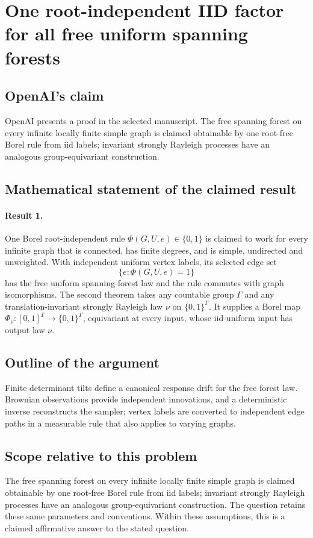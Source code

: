 \documentclass[11pt]{article}
\begin{document}
\section*{One root-independent IID factor for all free uniform spanning forests}

\subsection{OpenAI's claim}
OpenAI presents a proof in the selected manuscript. The free spanning forest on every infinite locally finite simple graph is claimed obtainable by one root-free Borel rule from iid labels; invariant strongly Rayleigh processes have an analogous group-equivariant construction.

\subsection{Mathematical statement of the claimed result}
\paragraph{Result 1.} One Borel root-independent rule \(\Phi(G,U,e)\in\{0,1\}\) is claimed to work for every infinite graph that is connected, has finite degrees, and is simple, undirected and unweighted. With independent uniform vertex labels, its selected edge set
\[
 \{e:\Phi(G,U,e)=1\}
\]
has the free uniform spanning-forest law and the rule commutes with graph isomorphisms. The second theorem takes any countable group \(\Gamma\) and any translation-invariant strongly Rayleigh law \(\nu\) on \(\{0,1\}^\Gamma\). It supplies a Borel map \(\Phi_\nu:[0,1]^\Gamma\to\{0,1\}^\Gamma\), equivariant at every input, whose iid-uniform input has output law \(\nu\).

\subsection{Outline of the argument}
Finite determinant tilts define a canonical response drift for the free forest law. Brownian observations provide independent innovations, and a deterministic inverse reconstructs the sampler; vertex labels are converted to independent edge paths in a measurable rule that also applies to varying graphs.

\subsection{Scope relative to this problem}
The free spanning forest on every infinite locally finite simple graph is claimed obtainable by one root-free Borel rule from iid labels; invariant strongly Rayleigh processes have an analogous group-equivariant construction. The question retains these same parameters and conventions. Within these assumptions, this is a claimed affirmative answer to the stated question.
\end{document}
